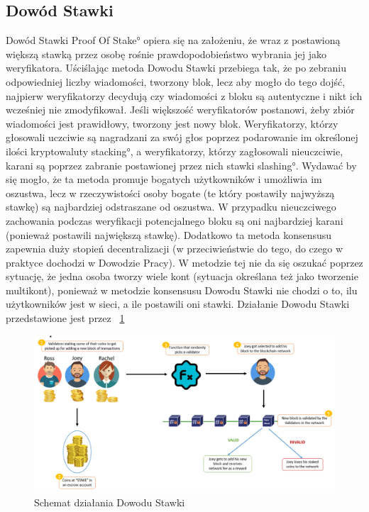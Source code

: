 \subsection{Dowód Stawki}
\label{ssec:PoS}
Dowód Stawki \ang{Proof Of Stake} opiera się na założeniu, że wraz z postawioną większą stawką przez osobę rośnie prawdopodobieństwo wybrania jej jako weryfikatora. Uściślając metoda Dowodu Stawki przebiega tak, że po zebraniu odpowiedniej liczby wiadomości, tworzony blok, lecz aby mogło do tego dojść, najpierw weryfikatorzy decydują czy wiadomości z bloku są autentyczne i nikt ich wcześniej nie zmodyfikował. Jeśli większość weryfikatorów postanowi, żeby zbiór wiadomości jest prawidłowy, tworzony jest nowy blok. Weryfikatorzy, którzy głosowali uczciwie są nagradzani za swój głos poprzez podarowanie im określonej ilości kryptowaluty \ang{stacking}, a weryfikatorzy, którzy zagłosowali nieuczciwie, karani są poprzez zabranie postawionej przez nich stawki \ang{slashing}. Wydawać by się mogło, że ta metoda promuje bogatych użytkowników i umożliwia im oszustwa, lecz w rzeczywistości osoby bogate (te który postawiły najwyższą stawkę) są najbardziej odstraszane od oszustwa. W przypadku nieuczciwego zachowania podczas weryfikacji potencjalnego bloku są oni najbardziej karani (ponieważ postawili największą stawkę). Dodatkowo ta metoda konsensusu zapewnia duży stopień decentralizacji (w przeciwieństwie do tego, do czego w praktyce dochodzi w Dowodzie Pracy). W metodzie tej nie da się oszukać poprzez sytuację, że jedna osoba tworzy wiele kont (sytuacja określana też jako tworzenie multikont), ponieważ w metodzie konsensusu Dowodu Stawki nie chodzi o to, ilu użytkowników jest w sieci, a ile postawili oni stawki. Działanie Dowodu Stawki przedstawione jest przez \figurename{~\ref{fig:ConsensusPOS}}
\begin{figure}[h]
    \centering
    \includegraphics[width=\textwidth]{Images/ConsensusPOS.png}
    \caption{Schemat działania Dowodu Stawki}
    \label{fig:ConsensusPOS}
\end{figure}


